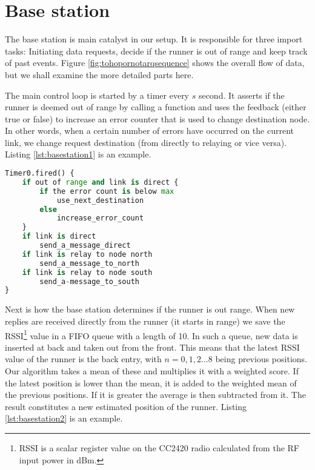 \section{Base station}\label{sc:basestation}

The base station is main catalyst in our setup. It is responsible for three import tasks: Initiating data requests, decide if the runner is out of range and keep track of past events. Figure \ref{fig:tohopornotarqsequence} shows the overall flow of data, but we shall examine the more detailed parts here.

\noindent The main control loop is started by a timer every $s$ second. It asserts if the runner is deemed out of range by calling a function and uses the feedback (either true or false) to increase an error counter that is used to change destination node. In other words, when a certain number of errors have occurred on the current link, we change request destination (from directly to relaying or vice versa). Listing \ref{lst:basestation1} is an example.
\noindent
\begin{minipage}[t]{0.95\linewidth}
	\begin{lstlisting}[language=Python, numbers=none, caption=XXX, label={lst:basestation1}]
Timer0.fired() {
	if out of range and link is direct {
		if the error count is below max
			use_next_destination
		else
			increase_error_count
	}
	if link is direct
		send_a_message_direct
	if link is relay to node north
		send_a_message_to_north
	if link is relay to node south
		send_a-message_to_south
}
	\end{lstlisting}
\end{minipage}

\noindent Next is how the base station determines if the runner is out range. When new replies are received directly from the runner (it starts in range) we save the RSSI\footnote{RSSI is a scalar register value on the CC2420 radio calculated from the RF input power in dBm.} value in a FIFO queue with a length of 10. In such a queue, new data is inserted at back and taken out from the front. This means that the latest RSSI value of the runner is the back entry, with $n=0,1,2...8$ being previous positions. Our algorithm takes a mean of these and multiplies it with a weighted score. If the latest position is lower than the mean, it is added to the weighted mean of the previous positions. If it is greater the average is then subtracted from it. The result constitutes a new estimated position of the runner. Listing \ref{lst:basestation2} is an example.


